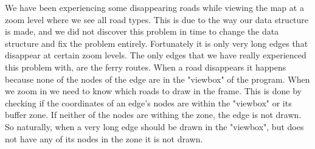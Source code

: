 We have been experiencing some disappearing roads while viewing the map at a zoom level where we see all road types. This is due to the way our data structure is made, and we did not discover this problem in time to change the data structure and fix the problem entirely. Fortunately it is only very long edges that disappear at certain zoom levels. The only edges that we have really experienced this problem with, are the ferry routes. When a road disappears it happens because none of the nodes of the edge are in the "viewbox" of the program. When we zoom in we need to know which roads to draw in the frame. This is done by checking if the coordinates of an edge's nodes are within the "viewbox" or its buffer zone. If neither of the nodes are withing the zone, the edge is not drawn. So naturally, when a very long edge should be drawn in the "viewbox", but does not have any of its nodes in the zone it is not drawn. 